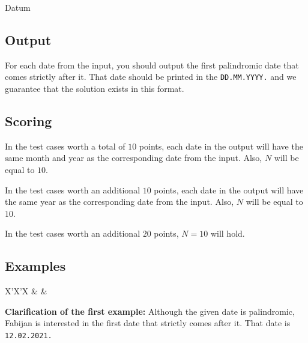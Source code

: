 \begin{statement}[
  problempoints=50,
  timelimit=1 second,
  memorylimit=512 MiB,
]{Datum}
\subsection*{Output}
For each date from the input, you should output the first palindromic date that
comes strictly after it. That date should be printed in the \texttt{DD.MM.YYYY.}
and we guarantee that the solution exists in this format.

\subsection*{Scoring}
In the test cases worth a total of $10$ points, each date in the output will
have the same month and year as the corresponding date from the input. Also,
$N$ will be equal to $10$.

In the test cases worth an additional $10$ points, each date in the output will
have the same year as the corresponding date from the input. Also, $N$ will
be equal to $10$.

In the test cases worth an additional $20$ points, $N=10$ will hold.

\subsection*{Examples}
\begin{tabularx}{\textwidth}{X'X'X}
 &
 &
\end{tabularx}

\textbf{Clarification of the first example:}
Although the given date is palindromic, Fabijan is interested in the first
date that strictly comes after it. That date is \texttt{12.02.2021.}

\end{statement}

